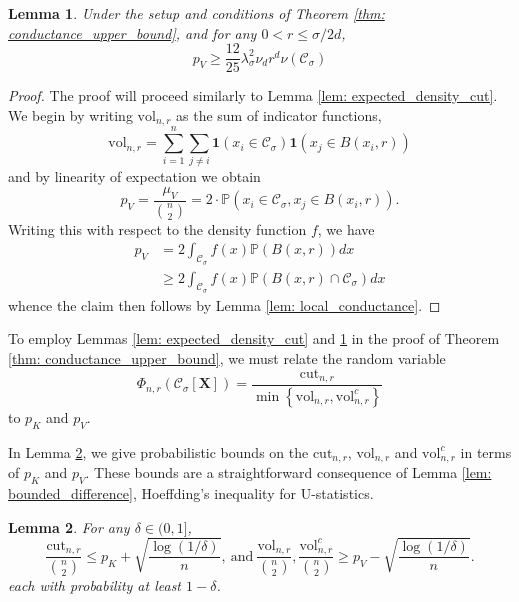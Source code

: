 \documentclass{article}
\newcommand{\set}[1]{\left\{#1\right\}}
\newcommand{\vol}{\mathrm{vol}}
\newcommand{\1}{\mathbf{1}}
\newcommand{\cut}{\mathrm{cut}}
\newcommand{\Xbf}{\mathbf{X}}
\newcommand{\Pbb}{\mathbb{P}}
\newcommand{\Cset}{\mathcal{C}}
\newcommand{\Csig}{\Cset_{\sigma}}
\theoremstyle{aldenthm}
\newtheorem{lemma}{Lemma}
\begin{document}
\begin{lemma}
	\label{lem: expected_density_volume}
	Under the setup and conditions of Theorem \ref{thm: conductance_upper_bound}, and for any $0 < r \leq \sigma/2d$,
	\begin{equation*}
	p_V \geq \frac{12}{25} \lambda_{\sigma}^2 \nu_d r^d \nu(\Csig)
	\end{equation*}
\end{lemma}
\begin{proof}
	The proof will proceed similarly to Lemma \ref{lem: expected_density_cut}. We begin by writing $\vol_{n,r}$ as the sum of indicator functions,
	\begin{equation}
	\label{eqn: volume_expansion}
	\vol_{n,r} = \sum_{i = 1}^{n} \sum_{j \neq i} \1(x_i \in \Csig) \1(x_j \in B(x_i, r))
	\end{equation}
	and by linearity of expectation we obtain
	\begin{equation*}
	p_V = \frac{\mu_V}{{n \choose 2}} = 2 \cdot \Pbb(x_i \in \Csig, x_j \in B(x_i,r)). \tag{for any $i,j$, $i \neq j$. }
	\end{equation*}
	Writing this with respect to the density function $f$, we have
	\begin{align*}
	p_V & = 2 \int_{\Csig} f(x) \Pbb(B(x,r)) dx \\
	& \geq 2 \int_{\Csig} f(x) \Pbb(B(x,r) \cap \Csig) dx
	\end{align*}
	whence the claim then follows by Lemma \ref{lem: local_conductance}.
\end{proof}

To employ Lemmas \ref{lem: expected_density_cut} and \ref{lem: expected_density_volume} in the proof of Theorem \ref{thm: conductance_upper_bound}, we must relate the random variable
\begin{equation*}
\Phi_{n,r}(\Csig[\Xbf]) = \frac{\cut_{n,r}}{\min \set{\vol_{n,r}, \vol_{n,r}^c}}
\end{equation*}
to $p_K$ and $p_V$. 

In Lemma \ref{lem: prob_bound_cutvol}, we give probabilistic bounds on the $\cut_{n,r}$, $\vol_{n,r}$ and $\vol_{n,r}^c$ in terms of $p_K$ and $p_V$. These bounds are a straightforward consequence of Lemma \ref{lem: bounded_difference}, Hoeffding's inequality for U-statistics.

\begin{lemma}
	\label{lem: prob_bound_cutvol}
	For any $\delta \in (0,1]$,
	\begin{equation}
	\label{eqn: numerator_additive_bound}
	\frac{\cut_{n,r}}{{n \choose 2}} \leq p_K + \sqrt{\frac{\log(1/\delta)}{n}},~\text{and}~ \frac{\vol_{n,r}}{{n \choose 2}}, \frac{\vol_{n,r}^c}{{n \choose 2}}  \geq p_V - \sqrt{\frac{\log(1/\delta)}{n}}.
	\end{equation}
	each with probability at least $1 - \delta$. 
\end{lemma}
\end{document}
